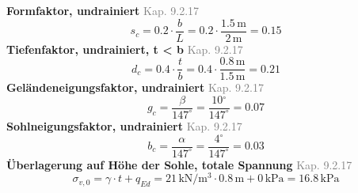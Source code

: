 \documentclass[11pt,a4paper]{article}
\newcommand{\normref}[1]{{\small\textcolor{gray}{#1}}}
\begin{document}
\noindent\textbf{Formfaktor, undrainiert} \hfill \normref{Kap. 9.2.17}
\begin{equation*}
s_c = 0.2 \cdot \frac{b}{L} = 0.2 \cdot \frac{1.5\,\mathrm{m}}{2\,\mathrm{m}} = 0.15
\end{equation*}
\noindent\textbf{Tiefenfaktor, undrainiert, t < b} \hfill \normref{Kap. 9.2.17}
\begin{equation*}
d_c = 0.4 \cdot \frac{t}{b} = 0.4 \cdot \frac{0.8\,\mathrm{m}}{1.5\,\mathrm{m}} = 0.21
\end{equation*}
\noindent\textbf{Geländeneigungsfaktor, undrainiert} \hfill \normref{Kap. 9.2.17}
\begin{equation*}
g_c = \frac{\beta}{147^\circ} = \frac{10{}^{\circ}}{147^\circ} = 0.07
\end{equation*}
\noindent\textbf{Sohlneigungsfaktor, undrainiert} \hfill \normref{Kap. 9.2.17}
\begin{equation*}
b_c = \frac{\alpha}{147^\circ} = \frac{4{}^{\circ}}{147^\circ} = 0.03
\end{equation*}
\noindent\textbf{Überlagerung auf Höhe der Sohle, totale Spannung} \hfill \normref{Kap. 9.2.17}
\begin{equation*}
\sigma_{v,0} = \gamma \cdot t + q_{Ed} = 21\,\mathrm{kN}/\mathrm{m}^{3} \cdot 0.8\,\mathrm{m} + 0\,\mathrm{kPa} = 16.8\,\mathrm{kPa}
\end{equation*}
\end{document}
